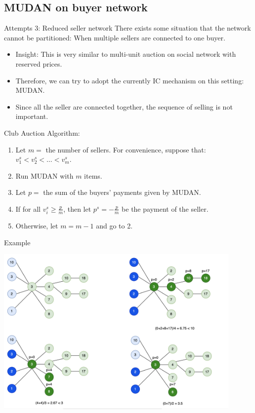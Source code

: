 \documentclass{beamer}
\begin{document}
\subsection{MUDAN on buyer network}
\begin{frame}{Attempts 3: Reduced seller network}
	There exists some situation that the network cannot be partitioned: When multiple sellers are connected to one buyer.\\\pause
	\begin{itemize}
		\item Insight: This is very similar to multi-unit auction on social network with reserved prices.
		\item Therefore, we can try to adopt the currently IC mechanism on this setting: MUDAN.
		\item Since all the seller are connected together, the sequence of selling is not important.
	\end{itemize}

\end{frame}
\begin{frame}{Club Auction}
	Algorithm:
	\begin{enumerate}
		\item Let \(m = \) the number of sellers. For convenience, suppose that: \(v^s_1 < v^s_2 < \ldots < v^s_m\).
		\item Run MUDAN with \(m\) items.
		\item Let \(p = \) the sum of the buyers' payments given by MUDAN.
		\item If for all \(v^s_i \geq \frac p m\), then let \(p^s = -\frac p m\) be the payment of the seller.
		\item Otherwise, let \(m = m - 1\) and go to 2.
	\end{enumerate}
\end{frame}
\begin{frame}{Example}
	\begin{center}
		\includegraphics[width=0.9\textwidth]{MUDAN}
	\end{center}
\end{frame}
\end{document}
